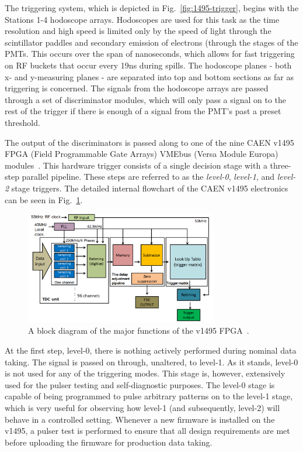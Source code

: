 The triggering system, which is depicted in Fig.~\ref{fig:1495-trigger}, begins with the Stations 1-4 hodoscope arrays. Hodoscopes are used for this task as the time resolution and high speed is limited only by the speed of light through the scintillator paddles and secondary emission of electrons (through the stages of the PMTs. This occurs over the span of nanoseconds, which allows for fast triggering on RF buckets that occur every 19ns during spills. The hodoscope planes - both x- and y-measuring planes - are separated into top and bottom sections as far as triggering is concerned. The signals from the hodoscope arrays are passed through a set of discriminator modules, which will only pass a signal on to the rest of the trigger if there is enough of a signal from the PMT's past a preset threshold.

The output of the discriminators is passed along to one of the nine CAEN v1495 FPGA (Field Programmable Gate Arrays) VMEbus (Versa Module Europa) modules~\cite{caen:v1495}. This hardware trigger consists of a single decision stage with a three-step parallel pipeline. These steps are referred to as the \emph{level-0}, \emph{level-1}, and \emph{level-2} stage triggers. The detailed internal flowchart of the CAEN v1495 electronics can be seen in Fig.~\ref{fig:v1495-internal}.

\begin{figure}
	\centering
	\includegraphics[width=0.75\textwidth]{figures/trigger-block-diagram.png}
	\caption{A block diagram of the major functions of the v1495 FPGA~\cite{Shiu:2015ura}.}
	\label{fig:v1495-internal}
\end{figure}

At the first step, level-0, there is nothing actively performed during nominal data taking. The signal is passed on through, unaltered, to level-1. As it stands, level-0 is not used for any of the triggering modes. This stage is, however, extensively used for the pulser testing and self-diagnostic purposes. The level-0 stage is capable of being programmed to pulse arbitrary patterns on to the level-1 stage, which is very useful for observing how level-1 (and subsequently, level-2) will behave in a controlled setting. Whenever a new firmware is installed on the v1495, a pulser test is performed to ensure that all design requirements are met before uploading the firmware for production data taking.

